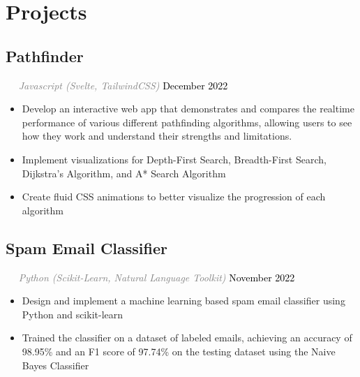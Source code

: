 \documentclass{article}
\newcommand{\resumesection}[3]{
    \subsection*{#1}
    \ 
    \ 
    \small
    \textcolor{grey}{\emph{#2}}
    \normalsize
    \hfill
    \textcolor{black}{#3}
    \normalsize
}
\begin{document}
\section*{Projects}

\resumesection{Pathfinder}{Javascript (Svelte, TailwindCSS)}{December 2022}
\begin{itemize}
    \item Develop an interactive web app that demonstrates and compares the realtime performance of various different pathfinding algorithms, allowing users to see how they work and understand their strengths and limitations.
    \item Implement visualizations for Depth-First Search, Breadth-First Search, Dijkstra's Algorithm, and A* Search Algorithm
    \item Create fluid CSS animations to better visualize the progression of each algorithm
\end{itemize}

\resumesection{Spam Email Classifier}{Python (Scikit-Learn, Natural Language Toolkit)}{November 2022}
\begin{itemize}
    \item Design and implement a machine learning based spam email classifier using Python and scikit-learn
    \item Trained the classifier on a dataset of labeled emails, achieving an accuracy of 98.95\% and an F1 score of 97.74\% on the testing dataset using the Naive Bayes Classifier
\end{itemize}
\end{document}

